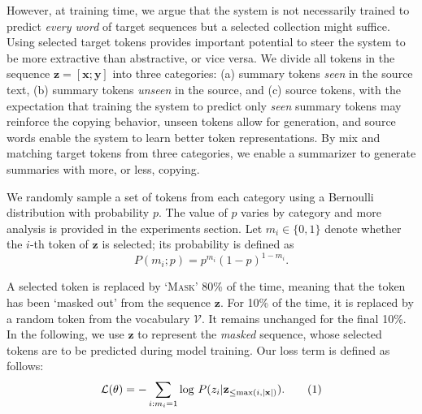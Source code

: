 \documentclass[letterpaper]{article} %
\newcommand\numberthis{\addtocounter{equation}{1}\tag{\theequation}}
\begin{document}
However, at training time, we argue that the system is not necessarily trained to predict \emph{every word} of target sequences but a selected collection might suffice. 
Using selected target tokens provides important potential to steer the system to be more extractive than abstractive, or vice versa.
We divide all tokens in the sequence $\mathbf{z} = [\mathbf{x};\mathbf{y}]$ into three categories: (a) summary tokens \emph{seen} in the source text, (b) summary tokens \emph{unseen} in the source, and (c) source tokens, with the expectation that training the system to predict only \emph{seen} summary tokens may reinforce the copying behavior, unseen tokens allow for generation, and source words enable the system to learn better token representations. 
By mix and matching target tokens from three categories, we enable a summarizer to generate summaries with more, or less, copying.


We randomly sample a set of tokens from each category using a Bernoulli distribution with probability $p$.
The value of $p$ varies by category and more analysis is provided in the experiments section.
Let $m_i \in \{0,1\}$ denote whether the $i$-th token of $\mathbf{z}$ is selected; its probability is defined as 
\begin{equation} 
\label{eq:Mask Rate}
P(m_i;p) = p^{m_i} (1-p)^{1-m_i}.
\end{equation}

A selected token is replaced by `\textsc{Mask}' 80\% of the time, meaning that the token has been `masked out' from the sequence $\mathbf{z}$.
For 10\% of the time, it is replaced by a random token from the vocabulary $\mathcal{V}$. It remains unchanged for the final 10\%.
In the following, we use $\mathbf{z}$ to represent the \emph{masked} sequence,
whose selected tokens are to be predicted during model training.
Our loss term is defined as follows:
\begin{align*}
\mathcal{L}(\theta)=-\sum_{i:m_i=1} \log\,P(z_i|\mathbf{z}_{\leq \max(i,|\mathbf{x}|)}).
\numberthis\label{eq:loss}
\end{align*}
\end{document}
